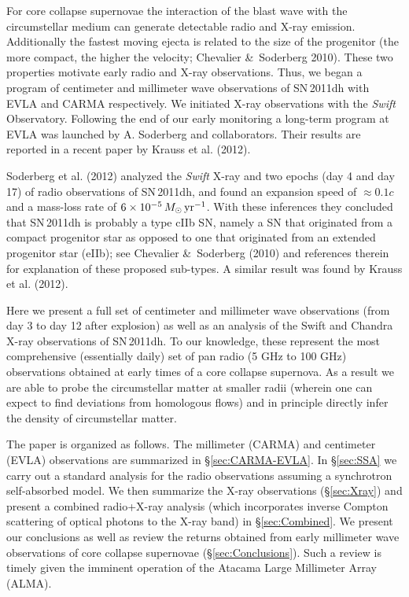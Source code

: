 \documentclass{emulateapj}
\begin{document}
For core collapse supernovae the interaction of the blast wave with the
circumstellar medium can generate detectable radio and X-ray emission.
Additionally the fastest moving ejecta is related to the size of the 
progenitor (the more compact, the higher the velocity; Chevalier \&\ Soderberg
2010). These two
properties motivate early radio and X-ray observations. Thus, we began a program
of centimeter and millimeter wave observations of SN\,2011dh with
EVLA and CARMA respectively. We initiated X-ray observations with the
{\it Swift} Observatory. Following the end of our early monitoring a
long-term program at EVLA was launched by A. Soderberg and
collaborators. Their results are reported in a recent paper by Krauss et
al. (2012). 

Soderberg et al. (2012) analyzed the {\it Swift} X-ray and  two epochs
(day 4 and day 17)
of radio observations of SN\,2011dh, and found an expansion speed of
$\approx 0.1c$ and a mass-loss rate of $6\times 10^{-5}\,M_\odot\,{\rm
yr}^{-1}$.  With these inferences they concluded that SN\,2011dh is probably a type cIIb SN, namely a SN that originated
from a compact progenitor star as opposed to one that originated
from an extended progenitor star (eIIb); see Chevalier \&\ Soderberg
(2010) and references therein for explanation of these proposed
sub-types. A similar result was found by Krauss et al. (2012). 




Here we present a full set of centimeter and millimeter wave
observations (from day 3 to day 12 after explosion) 
as well as an analysis of the Swift and
Chandra X-ray observations of SN\,2011dh. To our knowledge, these
represent the most comprehensive (essentially daily) set of pan radio (5 GHz to 100 GHz)
observations obtained at early times of a core collapse supernova. As a result we
are able to probe the circumstellar matter at smaller radii (wherein
one can expect to find deviations from homologous flows) and in
principle directly infer the density of circumstellar matter. 

The paper is organized as follows. 
The millimeter (CARMA) and centimeter (EVLA) observations are summarized in
\S\ref{sec:CARMA-EVLA}. In \S\ref{sec:SSA} we carry out a standard analysis for the radio
observations assuming a synchrotron self-absorbed model. We then summarize the
X-ray observations (\S\ref{sec:Xray}) and present a combined radio+X-ray
analysis (which incorporates inverse Compton scattering of optical photons
to the X-ray band) in \S\ref{sec:Combined}. We present our conclusions
as well as review the returns obtained from early millimeter wave observations
of core collapse supernovae (\S\ref{sec:Conclusions}). Such a review is
timely given the imminent operation of the Atacama Large Millimeter Array (ALMA).
\end{document}

